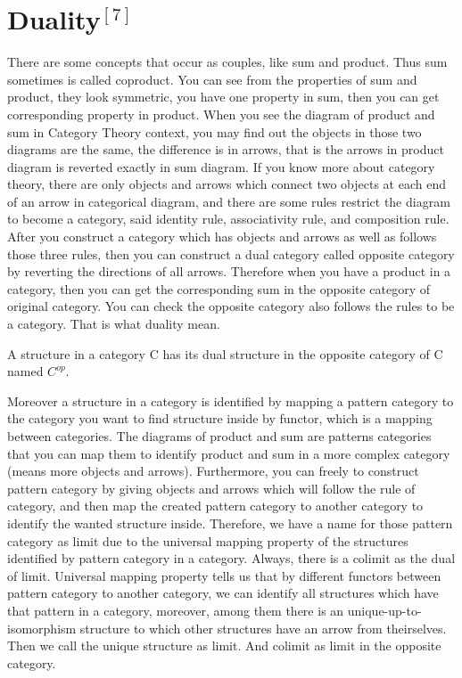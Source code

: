 \documentclass{article}
\begin{document}
\section{Duality$^{[7]}$}
There are some concepts that occur as couples, like sum and product. Thus sum sometimes is called coproduct. You can see from the properties of sum and product, they look symmetric, you have one property in sum, then you can get corresponding property in product. When you see the diagram of product and sum in Category Theory context, you may find out the objects in those two diagrams are the same, the difference is in arrows, that is the arrows in product diagram is reverted exactly in sum diagram. If you know more about category theory, there are only objects and arrows which connect two objects at each end of an arrow in categorical diagram, and there are some rules restrict the diagram to become a category, said identity rule, associativity rule, and composition rule. After you construct a category which has objects and arrows as well as follows those three rules, then you can construct a dual category called opposite category by reverting the directions of all arrows. Therefore when you have a product in a category, then you can get the corresponding sum in the opposite category of original category. You can check the opposite category also follows the rules to be a category. That is what duality mean. 


A structure in a category C has its dual structure in the opposite category of C named $C^{op}$. 


Moreover a structure in a category is identified by mapping a pattern category to the category you want to find structure inside by functor, which is a mapping between categories. The diagrams of product and sum are patterns categories that you can map them to identify product and sum in a more complex category (means more objects and arrows). Furthermore, you can freely to construct pattern category by giving objects and arrows which will follow the rule of category, and then map the created pattern category to another category to identify the wanted structure inside. Therefore, we have a name for those pattern category as limit due to the universal mapping property of the structures identified by pattern category in a category. Always, there is a colimit as the dual of limit. Universal mapping property tells us that by different functors between pattern category to another category, we can identify all structures which have that pattern in a category, moreover, among them there is an unique-up-to-isomorphism structure to which other structures have an arrow from theirselves. Then we call the unique structure as limit. And colimit as limit in the opposite category.
\end{document}
